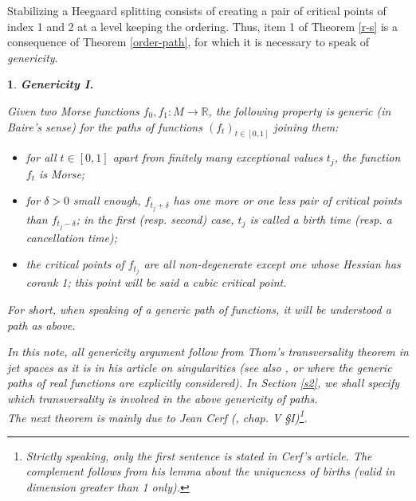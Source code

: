 \documentclass[12pt]{amsart}
\newtheorem{rien}[thm]{}
\def\R{\mathbb{R}}
\def\de{\delta}
\begin{document}
Stabilizing a Heegaard splitting 
consists of  creating a pair of critical points of index 1 and 2 at a level
keeping the ordering.
Thus, 
item 1 of Theorem \ref{r-s} is a consequence of  Theorem \ref{order-path}, for which it is necessary 
to speak of {\it genericity}.


\begin{rien} {\bf Genericity I.} \label{genI} {\rm Given two Morse functions $f_0,f_1: M\to\R$,
the following property is {\it generic} (in Baire's sense) for the paths of functions $\left(f_t\right)_{t\in [0,1]}$ joining them:
\begin{itemize}
\item for all $t\in[0,1]$ apart from finitely many  {\it exceptional} values 
$t_j$,  the function  $f_t$ is Morse;
\item %
 for $\de >0$ small enough, 
$f_{t_j+\de}$ has one more or one less pair of critical points  than $f_{t_j-\de}$; in the first 
(resp. second) case, 
$t_j$ is  called a {\it birth time} (resp. a {\it cancellation time});
\item  the critical points of $f_{t_j}$ are all 
 non-degenerate  except  one whose Hessian has corank  1; this point 
 will be said a {\it cubic critical point}.
\end{itemize}
For short, when speaking of a {\it generic} path of functions, it will be understood a path as above. 

 In this note, all  genericity argument  follow
from Thom's {\it  transversality theorem in jet spaces} as it is  in his article
on singularities \cite{thom56} (see also  \cite{hirsch}, or \cite{lauden} 
where the generic paths of real functions are  explicitly considered). 
In Section \ref{s2}, we shall specify which transversality is involved in the above genericity of paths.\\

The next theorem  is mainly due to Jean Cerf (\cite{cerf}, chap. V \S I)\footnote{Strictly speaking, only the first sentence is stated in Cerf's article. The complement  follows from his lemma about the {\it uniqueness of births}
(valid in dimension greater than 1 only).}. %
}
\end{rien}
\end{document}
